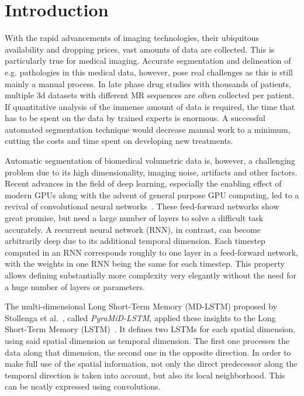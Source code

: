 \documentclass[runningheads,a4paper]{llncs}
\begin{document}
\section{Introduction}
With the rapid advancements of imaging technologies, their ubiquitous availability and dropping prices, vast amounts of data are collected. This is particularly true for medical imaging. Accurate segmentation and delineation of e.g. pathologies in this medical data, however, pose real challenges as this is still mainly a manual process. In late phase drug studies with thousands of patients, multiple 3d datasets with different MR sequences are often collected per patient. If quantitative analysis of the immense amount of data is required, the time that has to be spent on the data by trained experts is enormous. A successful automated segmentation technique would decrease manual work to a minimum, cutting the costs and time spent on developing new treatments.

Automatic segmentation of biomedical volumetric data is, however, a challenging problem due to its high dimensionality, imaging noise, artifacts and other factors. Recent advances in the field of deep learning, especially the enabling effect of modern GPUs along with the advent of general purpose GPU computing, led to a revival of convolutional neural networks~\cite{krizhevsky_imagenet_2012}. These feed-forward networks show great promise, but need a large number of layers to solve a difficult task accurately. A recurrent neural network (RNN), in contrast, can become arbitrarily deep due to its additional temporal dimension. Each timestep computed in an RNN corresponds roughly to one layer in a feed-forward network, with the weights in one RNN being the same for each timestep. This property allows defining substantially more complexity very elegantly without the need for a huge number of layers or parameters.

The multi-dimensional Long Short-Term Memory (MD-LSTM) proposed by Stollenga et al.~\cite{stollenga_parallel_2015}, called \textit{PyraMiD-LSTM}, applied these insights to the Long Short-Term Memory (LSTM)~\cite{hochreiter1997long}. It defines two LSTMs for each spatial dimension, using said spatial dimension as temporal dimension. The first one processes the data along that dimension, the second one in the opposite direction. In order to make full use of the spatial information, not only the direct predecessor along the temporal direction is taken into account, but also its local neighborhood. This can be neatly expressed using convolutions. 
\end{document}
